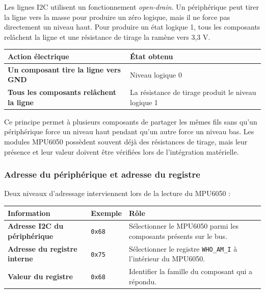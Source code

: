 \documentclass[11pt,a4paper]{article}
\begin{document}
	Les lignes I2C utilisent un fonctionnement \textit{open-drain}. Un périphérique peut tirer la ligne vers la masse pour produire un zéro logique, mais il ne force pas directement un niveau haut. Pour produire un état logique 1, tous les composants relâchent la ligne et une résistance de tirage la ramène vers 3,3 V.
	
	\begin{center}
		\begin{tabular}{>{\bfseries}p{4cm}p{8.5cm}}
			\toprule
			Action électrique & État obtenu \\
			\midrule
			Un composant tire la ligne vers GND & Niveau logique 0 \\
			Tous les composants relâchent la ligne & La résistance de tirage produit le niveau logique 1 \\
			\bottomrule
		\end{tabular}
	\end{center}
	
	Ce principe permet à plusieurs composants de partager les mêmes fils sans qu'un périphérique force un niveau haut pendant qu'un autre force un niveau bas. Les modules MPU6050 possèdent souvent déjà des résistances de tirage, mais leur présence et leur valeur doivent être vérifiées lors de l'intégration matérielle.
	
	\subsubsection*{Adresse du périphérique et adresse du registre}
	
	Deux niveaux d'adressage interviennent lors de la lecture du MPU6050 :
	
	\begin{center}
		\begin{tabular}{>{\bfseries}p{4.2cm}p{3cm}p{6cm}}
			\toprule
			Information & Exemple & Rôle \\
			\midrule
			Adresse I2C du périphérique & \texttt{0x68} & Sélectionner le MPU6050 parmi les composants présents sur le bus. \\
			Adresse du registre interne & \texttt{0x75} & Sélectionner le registre \texttt{WHO\_AM\_I} à l'intérieur du MPU6050. \\
			Valeur du registre & \texttt{0x68} & Identifier la famille du composant qui a répondu. \\
			\bottomrule
		\end{tabular}
	\end{center}
	
\end{document}
